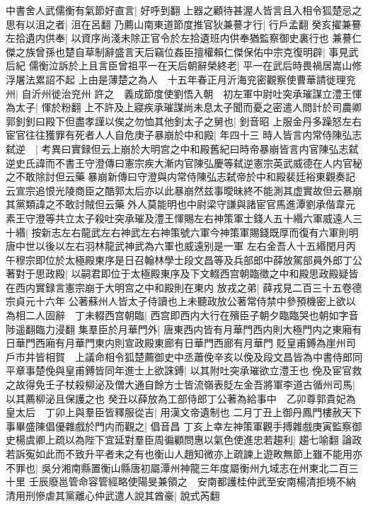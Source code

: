 中書舍人武儒衡有氣節好直言|{
	好呼到翻}
上器之顧待甚渥人皆言且入相令狐楚忌之思有以沮之者|{
	沮在呂翻}
乃薦山南東道節度推官狄兼謩才行|{
	行戶孟翻}
癸亥擢兼謩左拾遺内供奉|{
	以資序尚淺未除正官令於左拾遺班内供奉猶監察御史裏行也}
兼謩仁傑之族曾孫也楚自草制辭盛言天后竊位姦臣擅權賴仁傑保佑中宗克復明辟|{
	事見武后紀}
儒衡泣訴於上且言臣曾祖平一在天后朝辭榮終老|{
	平一在武后時畏禍居嵩山修浮屠法累詔不起}
上由是薄楚之為人　十五年春正月沂海兖密觀察使曹華請徙理兖州|{
	自沂州徙治兖州}
許之　義成節度使劉悟入朝　初左軍中尉吐突承璀謀立澧王惲為太子|{
	惲於粉翻}
上不許及上寢疾承璀謀尚未息太子聞而憂之密遣人問計於司農卿郭釗釗曰殿下但盡孝謹以俟之勿恤其他釗太子之舅也|{
	釗音昭}
上服金丹多躁怒左右宦官往往獲罪有死者人人自危庚子暴崩於中和殿|{
	年四十三}
時人皆言内常侍陳弘志弑逆　|{
	考異曰實録但云上崩於大明宫之中和殿舊紀曰時帝暴崩皆言内官陳弘志弑逆史氏諱而不書王守澄傳曰憲宗疾大漸内官陳弘慶等弑逆憲宗英武威德在人内官秘之不敢除討但云藥暴崩新傳曰守澄與内常侍陳弘志弑帝於中和殿裴廷裕東觀奏記云宣宗追恨光陵商臣之酷郭太后亦以此暴崩然兹事曖昧終不能測其虚實故但云暴崩}
其黨類諱之不敢討賊但云藥外人莫能明也中尉梁守謙與諸宦官馬進潭劉承偕韋元素王守澄等共立太子殺吐突承璀及澧王惲賜左右神策軍士錢人五十緡六軍威遠人三十緡|{
	按新志左右龍武左右神武左右神策號六軍今神策軍賜錢既厚而復有六軍則明唐中世以後以左右羽林龍武神武為六軍也威遠别是一軍}
左右金吾人十五緡閏月丙午穆宗即位於太極殿東序是日召翰林學士段文昌等及兵部郎中薛放駕部員外郎丁公著對于思政殿|{
	以嗣君即位于太極殿東序及下文輟西宫朝臨徵之中和殿思政殿疑皆在西内實録言憲宗崩于大明宫之中和殿則在東内}
放戎之弟|{
	薛戎見二百三十五卷德宗貞元十六年}
公著蘇州人皆太子侍讀也上未聽政放公著常侍禁中參預機密上欲以為相二人固辭　丁未輟西宫朝臨|{
	西宫即西内大行在殯臣子朝夕臨臨哭也朝如字音陟遥翻臨力浸翻}
集羣臣於月華門外|{
	唐東西内皆有月華門西内則大極門内之東廂有日華門西廂有月華門東内則宣政殿東廊有日華門西廊有月華門}
貶皇甫鎛為崖州司戶市井皆相賀　上議命相令狐楚薦御史中丞蕭俛辛亥以俛及段文昌皆為中書侍郎同平章事楚俛與皇甫鎛皆同年進士上欲誅鎛|{
	以其附吐突承璀欲立澧王也}
俛及宦官救之故得免壬子杖殺柳泌及僧大通自餘方士皆流嶺表貶左金吾將軍李道古循州司馬|{
	以其薦柳泌且保護之也}
癸丑以薛放為工部侍郎丁公著為給事中　乙卯尊郭貴妃為皇太后　丁卯上與羣臣皆釋服從吉|{
	用漢文帝遺制也}
二月丁丑上御丹鳳門樓赦天下事畢盛陳倡優雜戲於門内而觀之|{
	倡音昌}
丁亥上幸左神策軍觀手搏雜戲庚寅監察御史楊虞卿上疏以為陛下宜延對羣臣周徧顧問惠以氣色使進忠若趨利|{
	趨七喻翻}
論政若訴寃如此而不致升平者未之有也衡山人趙知微亦上疏諫上遊畋無節上雖不能用亦不罪也|{
	吳分湘南縣置衡山縣唐初屬潭州神龍三年度屬衡州九域志在州東北二百三十里}
壬辰廢邕管命容管經略使陽旻兼領之　安南都護桂仲武至安南楊清拒境不納清用刑慘虐其黨離心仲武遣人說其酋豪|{
	說式芮翻}
